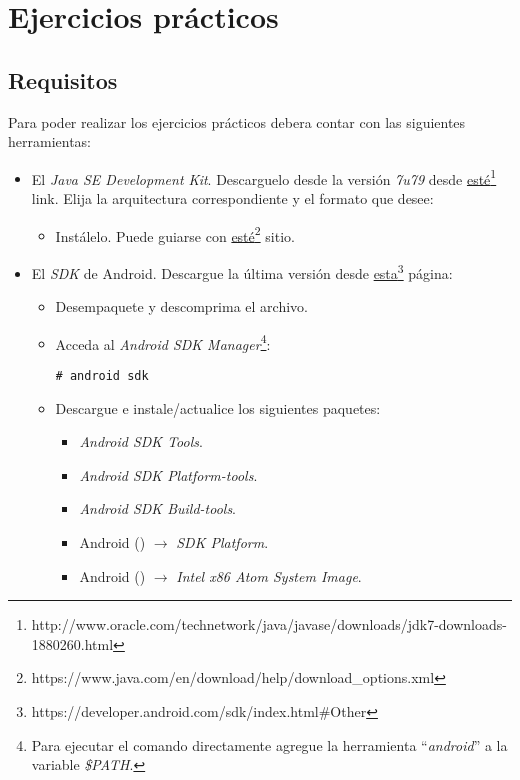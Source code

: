 \section{Ejercicios prácticos}

\subsection{Requisitos}
Para poder realizar los ejercicios prácticos debera contar con las siguientes herramientas:
\begin{itemize}
 \item El \textit{Java SE Development Kit}. Descarguelo desde la versión \emph{7u79} desde \href{http://www.oracle.com/technetwork/java/javase/downloads/jdk7-downloads-1880260.html}{esté}\footnote{http://www.oracle.com/technetwork/java/javase/downloads/jdk7-downloads-1880260.html} link. Elija la arquitectura correspondiente y el formato que desee:
 \begin{itemize}
      \item Instálelo. Puede guiarse con \href{https://www.java.com/en/download/help/download\_options.xml}{esté}\footnote{https://www.java.com/en/download/help/download\_options.xml} sitio.      
 \end{itemize}

 \item El \textit{SDK} de Android. Descargue la última versión desde \href{https://developer.android.com/sdk/index.html\#Other}{esta}\footnote{https://developer.android.com/sdk/index.html\#Other} página:
 \begin{itemize}
      \item Desempaquete y descomprima el archivo.
      
      \item Acceda al \textit{Android SDK Manager}\footnote{Para ejecutar el comando directamente agregue la herramienta ``\textit{android}'' a la variable \textit{\$PATH}.}:
      \begin{lstlisting}
# android sdk
      \end{lstlisting}
     
      \item Descargue e instale/actualice los siguientes paquetes:
      \begin{itemize}
  \item \textit{Android SDK Tools}.
  \item \textit{Android SDK Platform-tools}.
  \item \textit{Android SDK Build-tools}.
  \item Android \ANDROIDVERSION(\ANDROIDVERSIONAPI) $\rightarrow$ \textit{SDK Platform}.
  \item Android \ANDROIDVERSION(\ANDROIDVERSIONAPI) $\rightarrow$ \textit{Intel x86 Atom System Image}.
      \end{itemize}


\end{itemize}
\end{itemize}
